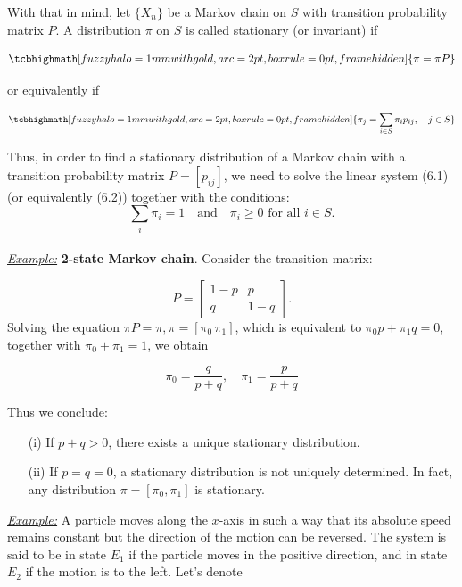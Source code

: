 \documentclass[a4paper,10pt]{article}
\newcommand{\equationgold}[1]{
  \tcbhighmath[fuzzy halo=1mm with gold,arc=2pt,boxrule=0pt,frame hidden]{#1}
}
\begin{document}
With that in mind, let $\{X_n\}$ be a Markov chain on $S$ with transition probability matrix $P$. A distribution $\pi$ on $S$ is called stationary (or invariant) if


\begin{equation}
    \equationgold{
        \pi = \pi P    
    }
\end{equation}

or equivalently if

\begin{equation}
    \equationgold{
        \pi_j = \sum_{i \in S} \pi_i p_{ij}, \quad j \in S
    }
\end{equation}

Thus, in order to find a stationary distribution of a Markov chain with a transition probability matrix $P = [p_{ij}]$, we need to solve the linear system (6.1) (or equivalently (6.2)) together with the conditions:
\[
\sum_{i} \pi_i = 1 \quad \text{and} \quad \pi_i \geq 0 \text{ for all } i \in S.
\]\\

\noindent \textit{\underline{Example:}} \textbf{2-state Markov chain}. Consider the transition matrix:

\[
P = \begin{bmatrix}
1 - p & p \\
q & 1 - q
\end{bmatrix}.
\]
Solving the equation $\pi P = \pi, \pi = [\pi_0 \, \pi_1]$, which is equivalent to $\pi_0 p + \pi_1 q = 0$, together with $\pi_0 + \pi_1 = 1$, we obtain

\[
\pi_0 = \frac{q}{p + q}, \quad \pi_1 = \frac{p}{p + q}
\]

\noindent Thus we conclude:
\begin{itemize}
    \item[(i)] If $p + q > 0$, there exists a unique stationary distribution.
    \item[(ii)] If $p = q = 0$, a stationary distribution is not uniquely determined. In fact, any distribution $\pi = [\pi_0, \pi_1]$ is stationary.\\
\end{itemize}

\noindent \underline{\textit{Example:}} A particle moves along the $x$-axis in such a way that its absolute speed remains constant but the direction of the motion can be reversed. The system is said to be in state $E_1$ if the particle moves in the positive direction, and in state $E_2$ if the motion is to the left. Let's denote
\end{document}
